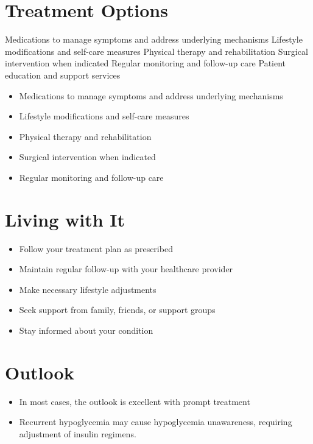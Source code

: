 \section{Treatment Options}
Medications to manage symptoms and address underlying mechanisms Lifestyle modifications and self-care measures Physical therapy and rehabilitation Surgical intervention when indicated Regular monitoring and follow-up care Patient education and support services

\begin{itemize}[noitemsep]
  \item Medications to manage symptoms and address underlying mechanisms
  \item Lifestyle modifications and self-care measures
  \item Physical therapy and rehabilitation
  \item Surgical intervention when indicated
  \item Regular monitoring and follow-up care
\end{itemize}
\section{Living with It}
\begin{itemize}[noitemsep]
  \item Follow your treatment plan as prescribed
  \item Maintain regular follow-up with your healthcare provider
  \item Make necessary lifestyle adjustments
  \item Seek support from family, friends, or support groups
  \item Stay informed about your condition
\end{itemize}
\section{Outlook}
\begin{itemize}[noitemsep]
  \item In most cases, the outlook is excellent with prompt treatment
  \item Recurrent hypoglycemia may cause hypoglycemia unawareness, requiring adjustment of insulin regimens.
\end{itemize}
